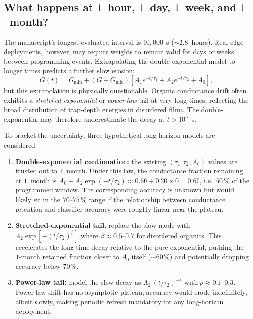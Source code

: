 \subsection{What happens at $1$~hour, $1$~day, $1$~week, and $1$~month?}

The manuscript's longest evaluated interval is $10{,}000$~s ($\sim$$2.8$~hours).  Real edge deployments, however, may require weights to remain valid for days or weeks between programming events.  Extrapolating the double-exponential model to longer times predicts a further slow erosion:
\begin{equation}
    G(t) = G_{\min} + (G - G_{\min}) \left[A_{1} e^{-t/\tau_{1}} + A_{2} e^{-t/\tau_{2}} + A_{0}\right],
    \label{eq:retention-extrapolate}
\end{equation}
but this extrapolation is physically questionable.  Organic conductance drift often exhibits a \emph{stretched-exponential} or \emph{power-law} tail at very long times, reflecting the broad distribution of trap-depth energies in disordered films.  The double-exponential may therefore underestimate the decay at $t > 10^{5}$~s.

To bracket the uncertainty, three hypothetical long-horizon models are considered:
\begin{enumerate}
    \item \textbf{Double-exponential continuation:} the existing $(\tau_{1}, \tau_{2}, A_{0})$ values are trusted out to $1$~month.  Under this law, the conductance fraction remaining at $1$~month is $A_{0} + A_{2}\exp(-t/\tau_{2}) \approx 0.60 + 0.20 \times 0 = 0.60$, i.e.~$60\,\%$ of the programmed window.  The corresponding accuracy is unknown but would likely sit in the $70$--$75\,\%$ range if the relationship between conductance retention and classifier accuracy were roughly linear near the plateau.
    \item \textbf{Stretched-exponential tail:} replace the slow mode with $A_{2} \exp\!\left[-(t/\tau_{2})^{\beta}\right]$ where $\beta \approx 0.5$--$0.7$ for disordered organics.  This accelerates the long-time decay relative to the pure exponential, pushing the $1$-month retained fraction closer to $A_{0}$ itself ($\sim$$60\,\%$) and potentially dropping accuracy below $70\,\%$.
    \item \textbf{Power-law tail:} model the slow decay as $A_{2}\,(t/\tau_{2})^{-p}$ with $p \approx 0.1$--$0.3$.  Power-law drift has no asymptotic plateau; accuracy would erode indefinitely, albeit slowly, making periodic refresh mandatory for any long-horizon deployment.
\end{enumerate}

